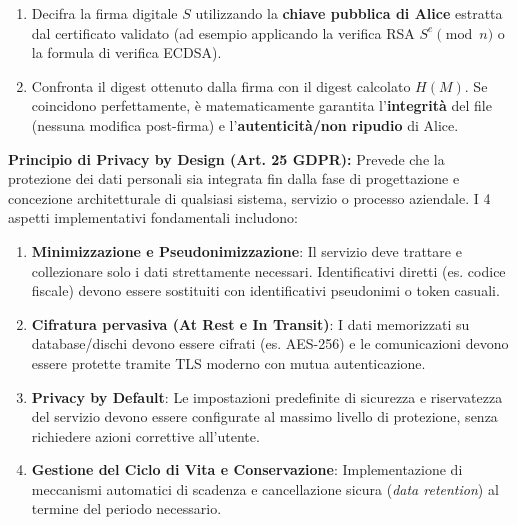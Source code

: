 \documentclass[11pt,a4paper]{article}
\begin{document}
\begin{solutionbox}
\begin{enumerate}
\begin{enumerate}
        \item Decifra la firma digitale $S$ utilizzando la \textbf{chiave pubblica di Alice} estratta dal certificato validato (ad esempio applicando la verifica RSA $S^e \pmod n$ o la formula di verifica ECDSA).
        \item Confronta il digest ottenuto dalla firma con il digest calcolato $H(M)$. Se coincidono perfettamente, \`e matematicamente garantita l'\textbf{integrit\`a} del file (nessuna modifica post-firma) e l'\textbf{autenticit\`a/non ripudio} di Alice.
    \end{enumerate}
\end{enumerate}
\end{solutionbox}

\begin{solutionbox}
\textbf{Principio di Privacy by Design (Art. 25 GDPR):}
Prevede che la protezione dei dati personali sia integrata fin dalla fase di progettazione e concezione architetturale di qualsiasi sistema, servizio o processo aziendale. I 4 aspetti implementativi fondamentali includono:
\begin{enumerate}
    \item \textbf{Minimizzazione e Pseudonimizzazione}: Il servizio deve trattare e collezionare solo i dati strettamente necessari. Identificativi diretti (es. codice fiscale) devono essere sostituiti con identificativi pseudonimi o token casuali.
    \item \textbf{Cifratura pervasiva (At Rest e In Transit)}: I dati memorizzati su database/dischi devono essere cifrati (es. AES-256) e le comunicazioni devono essere protette tramite TLS moderno con mutua autenticazione.
    \item \textbf{Privacy by Default}: Le impostazioni predefinite di sicurezza e riservatezza del servizio devono essere configurate al massimo livello di protezione, senza richiedere azioni correttive all'utente.
    \item \textbf{Gestione del Ciclo di Vita e Conservazione}: Implementazione di meccanismi automatici di scadenza e cancellazione sicura (\textit{data retention}) al termine del periodo necessario.
\end{enumerate}


\end{solutionbox}
\end{document}
